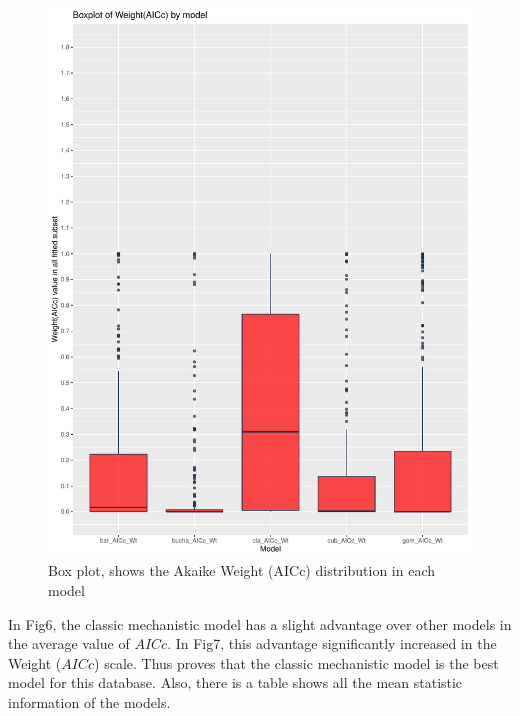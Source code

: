 \documentclass[11pt]{article}
\begin{document}
\begin{figure}[H]
    \centering
	\includegraphics[width = \textwidth]{../results/images/boxplot_2.pdf}
    \caption{Box plot, shows the Akaike Weight (AICc) distribution in each model}
    \label{fig7}
\end{figure}

In Fig6, the classic mechanistic model has a slight advantage over other models in the average value of $AICc$. In Fig7, this advantage significantly increased in the Weight ($AICc$) scale. Thus proves that the classic mechanistic model is the best model for this database.
Also, there is a table shows all the mean statistic information of the models.
\end{document}
